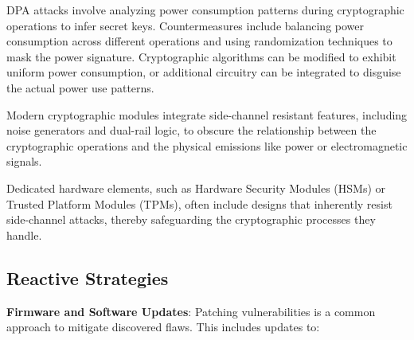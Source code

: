   DPA attacks involve analyzing power consumption patterns during cryptographic operations to infer secret keys. Countermeasures include balancing power consumption across different operations and using randomization techniques to mask the power signature. Cryptographic algorithms can be modified to exhibit uniform power consumption, or additional circuitry can be integrated to disguise the actual power use patterns.

  Modern cryptographic modules integrate side-channel resistant features, including noise generators and dual-rail logic, to obscure the relationship between the cryptographic operations and the physical emissions like power or electromagnetic signals.

  Dedicated hardware elements, such as Hardware Security Modules (HSMs) or Trusted Platform Modules (TPMs), often include designs that inherently resist side-channel attacks, thereby safeguarding the cryptographic processes they handle.
  
\hypertarget{reactive-strategies}{%
\subsection{Reactive Strategies}\label{reactive-strategies}}

\textbf{Firmware and Software Updates}: Patching vulnerabilities is a
common approach to mitigate discovered flaws. This includes updates to:

